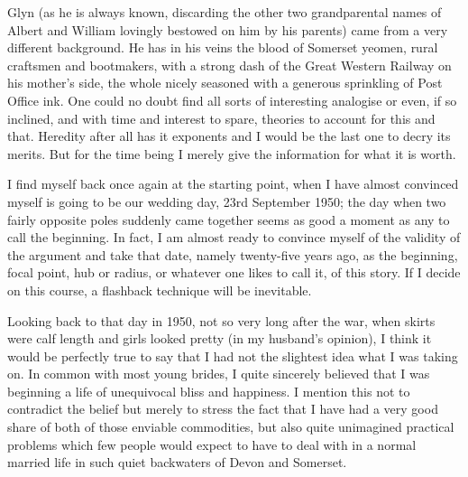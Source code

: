 Glyn (as he is always known, discarding the other two grandparental names of Albert and William lovingly bestowed on him by his parents) came from a very different background. He has in his veins the blood of Somerset yeomen, rural craftsmen and bootmakers, with a strong dash of the Great Western Railway on his mother's side, the whole nicely seasoned with a generous sprinkling of Post Office ink. One could no doubt find all sorts of interesting analogise or even, if so inclined, and with time and interest to spare, theories to account for this and that. Heredity after all has it exponents and I would be the last one to decry its merits. But for the time being I merely give the information for what it is worth.

I find myself back once again at the starting point, when I have almost convinced myself is going to be our wedding day, 23rd September 1950; the day when two fairly opposite poles suddenly came together seems as good a moment as any to call the beginning. In fact, I am almost ready to convince myself of the validity of the argument and take that date, namely twenty-five years ago, as the beginning, focal point, hub or radius, or whatever one likes to call it, of this story. If I decide on this course, a flashback technique will be inevitable.

Looking back to that day in 1950, not so very long after the war, when skirts were calf length and girls looked pretty (in my husband's opinion), I think it would be perfectly true to say that I had not the slightest idea what I was taking on. In common with most young brides, I quite sincerely believed that I was beginning a life of unequivocal bliss and happiness. I mention this not to contradict the belief but merely to stress the fact that I have had a very good share of both of those enviable commodities, but also quite unimagined practical problems which few people would expect to have to deal with in a normal married life in such quiet backwaters of Devon and Somerset. 